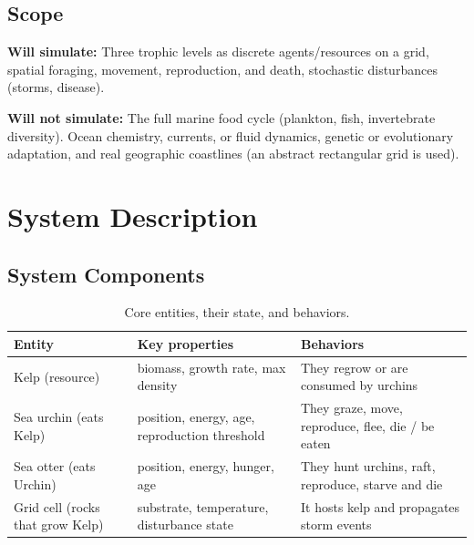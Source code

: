 \documentclass[manuscript,nonacm,11pt]{acmart}
\begin{document}
\subsection{Scope}
\textbf{Will simulate:} Three trophic levels as discrete agents/resources on a
grid, spatial foraging, movement, reproduction, and death, stochastic
disturbances (storms, disease). 

\textbf{Will not simulate:} The full marine food cycle (plankton, fish,
invertebrate diversity). Ocean chemistry, currents, or fluid dynamics, genetic or evolutionary adaptation, and
real geographic coastlines (an abstract rectangular grid is used).

\section{System Description}

\subsection{System Components}

\begin{table}[H]
  \caption{Core entities, their state, and behaviors.}
  \label{tab:components}
  \small
  \begin{tabularx}{\linewidth}{@{}>{\raggedright\arraybackslash}p{2.4cm}XX@{}}
    \toprule
    \textbf{Entity} & \textbf{Key properties} & \textbf{Behaviors} \\
    \midrule
    Kelp (resource) & biomass, growth rate, max density &
      They regrow or are consumed by urchins \\
    Sea urchin (eats Kelp) & position, energy, age, reproduction threshold &
      They graze, move, reproduce, flee, die / be eaten \\
    Sea otter (eats Urchin) & position, energy, hunger, age &
      They hunt urchins, raft, reproduce, starve and die \\
    Grid cell (rocks that grow Kelp) & substrate, temperature, disturbance state &
      It hosts kelp and propagates storm events \\
    \bottomrule
  \end{tabularx}
\end{table}
\end{document}
